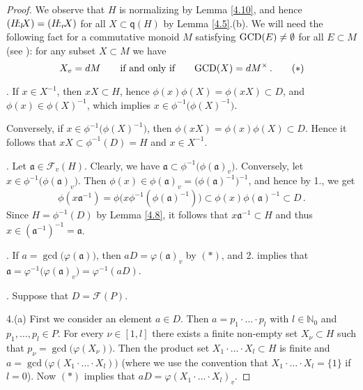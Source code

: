 \documentclass[a4paper]{amsart}
\theoremstyle{definition}
\numberwithin{equation}{section}
\begin{document}
\begin{proof}
We observe that  $H$ is normalizing by Lemma \ref{4.10}, and hence
$(H {\negthinspace :_l \negthinspace} X) = (H {\negthinspace :_r \negthinspace} X)$ for all $X \subset \mathsf q (H)$ by Lemma
\ref{4.5}.(b).  We will need the following fact for a commutative
monoid $M$ satisfying $\text{\rm GCD} (E) \ne \emptyset$ for all $E
\subset M$ (see \cite[Theorem 11.5]{HK98}): for any subset $X
\subset M$ we have
\[
X_v = dM \qquad \text{if and only if} \qquad \text{\rm GCD} (X) = dM^{\times} \,. \tag{$*$}
\]

. If $x \in X^{-1}$, then $xX \subset H$, hence $\phi(x) \phi(X) =
\phi(xX) \subset D$, and $\phi(x) \in \phi(X)^{-1}$, which implies
$x \in \phi^{-1} \bigl(\phi(X)^{-1}\bigr)$.

Conversely, if $x \in \phi^{-1}\bigl(\phi(X)^{-1}\bigr)$, then
$\phi(xX) = \phi(x) \phi(X) \subset D$. Hence it follows that $xX
\subset \phi^{-1}(D) = H$ and $x \in X^{-1}$.

. Let $\mathfrak a \in \mathcal F_v (H)$. Clearly, we have
$\mathfrak a \subset \phi^{-1} \big( \phi (\mathfrak a)_v \big)$.
Conversely, let $x \in \phi^{-1} \big( \phi (\mathfrak a)_v \big)$.
Then $\phi (x) \in \phi (\mathfrak a)_v = \big( \phi ( \mathfrak
a)^{-1} \big)^{-1}$, and hence by 1., we get
\[
\phi ( x \mathfrak a^{-1} ) = \phi \big( x \phi^{-1} ( \phi (
\mathfrak a)^{-1}) \big) \subset \phi (x) \phi ( \mathfrak a)^{-1}
\subset D \,.
\]
Since $H =  \phi^{-1} (D)$ by Lemma \ref{4.8}, it follows that $x
\mathfrak a^{-1} \subset H$ and thus $x \in (\mathfrak a^{-1})^{-1}
= \mathfrak a$.

. If $a = \gcd \big( \varphi (\mathfrak a) \big)$, then $aD =
\varphi (\mathfrak a)_v$ by $(*)$, and 2.
implies that $\mathfrak a = \varphi^{-1} \big( \varphi (\mathfrak
a)_v \big) = \varphi^{-1} (aD)$.

.  Suppose that   $D = \mathcal F (P)$.

4.(a) First we consider an element $a \in D$. Then $a = p_1 \cdot
\ldots \cdot p_l$ with $l \in \mathbb N_0$ and $p_1, \ldots, p_l \in
P$. For every $\nu \in [1, l]$ there exists a finite non-empty set
$X_{\nu} \subset H$ such that $p_{\nu} = \gcd \big( \varphi
(X_{\nu}) \big)$. Then the product set $X_1 \cdot \ldots \cdot X_l
\subset H$ is finite and $a = \gcd \big( \varphi (X_1 \cdot \ldots
\cdot X_l) \big)$ (where we use the convention that $X_1 \cdot
\ldots \cdot X_l = \{1\}$ if $l=0$). Now $(*)$ implies that $aD =
\varphi (X_1 \cdot \ldots \cdot X_l)_v$.


\end{proof}
\end{document}

